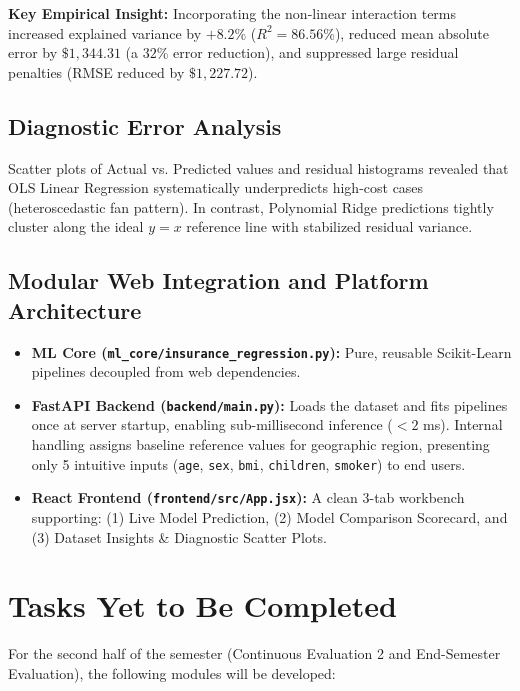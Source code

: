 \documentclass[11pt,a4paper]{article}
\begin{document}
\textbf{Key Empirical Insight:} Incorporating the non-linear interaction terms increased explained variance by $+8.2\%$ ($R^2 = 86.56\%$), reduced mean absolute error by $\$1,344.31$ (a $32\%$ error reduction), and suppressed large residual penalties (RMSE reduced by $\$1,227.72$).

\subsection{Diagnostic Error Analysis}
Scatter plots of Actual vs. Predicted values and residual histograms revealed that OLS Linear Regression systematically underpredicts high-cost cases (heteroscedastic fan pattern). In contrast, Polynomial Ridge predictions tightly cluster along the ideal $y=x$ reference line with stabilized residual variance.

\subsection{Modular Web Integration and Platform Architecture}
\begin{itemize}[leftmargin=*,itemsep=1pt,topsep=2pt]
    \item \textbf{ML Core (\texttt{ml\_core/insurance\_regression.py}):} Pure, reusable Scikit-Learn pipelines decoupled from web dependencies.
    \item \textbf{FastAPI Backend (\texttt{backend/main.py}):} Loads the dataset and fits pipelines once at server startup, enabling sub-millisecond inference ($<2$ ms). Internal handling assigns baseline reference values for geographic region, presenting only 5 intuitive inputs (\texttt{age}, \texttt{sex}, \texttt{bmi}, \texttt{children}, \texttt{smoker}) to end users.
    \item \textbf{React Frontend (\texttt{frontend/src/App.jsx}):} A clean 3-tab workbench supporting: (1) Live Model Prediction, (2) Model Comparison Scorecard, and (3) Dataset Insights \& Diagnostic Scatter Plots.
\end{itemize}

\section{Tasks Yet to Be Completed}
\label{sec:remaining}
For the second half of the semester (Continuous Evaluation 2 and End-Semester Evaluation), the following modules will be developed:
\end{document}
